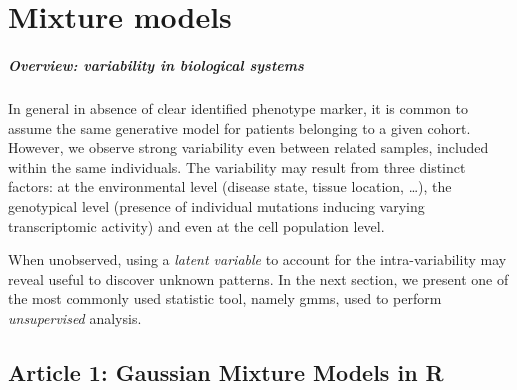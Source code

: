 \chapter{Mixture models} 
\label{chap:gmm-benchmark}

\paragraph{Overview: variability in biological systems}

In general in absence of clear identified phenotype marker, it is common to assume the same generative model for patients belonging to a given cohort. 
However, we observe strong variability even between related samples, included within the same individuals. The variability may result from three distinct factors: at the environmental level (disease state, tissue location, \ldots), the genotypical level (presence of individual mutations inducing varying transcriptomic activity) and even at the cell population level. 

When unobserved, using a \textit{latent variable} to account for the intra-variability may reveal useful to discover unknown patterns. In the next section, we present one of the most commonly used statistic tool, namely \Glspl{gmm}, used to perform \textit{unsupervised} analysis. 


\section{Article 1: Gaussian Mixture Models in R}













